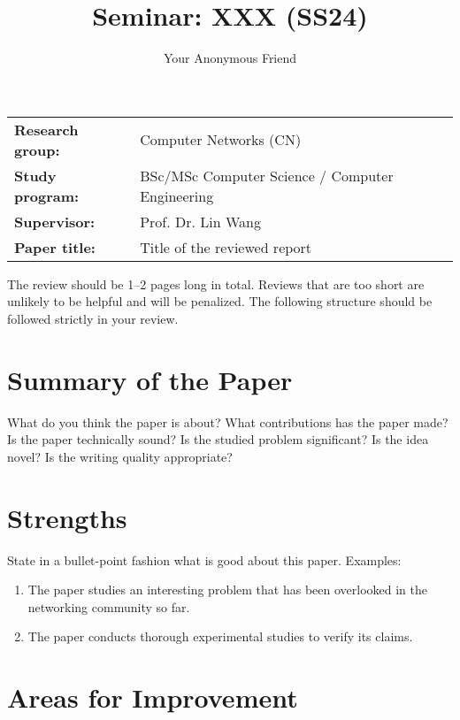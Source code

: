 \documentclass{../upb-cn}
\title{Seminar: XXX (SS24)}
\author{Your Anonymous Friend}
\begin{document}
\maketitle

\begin{notebox}
    \begin{tabular}{@{}ll}
        \textbf{Research group:} & Computer Networks (CN) \\
        \textbf{Study program:} & BSc/MSc Computer Science / Computer Engineering \\
        \textbf{Supervisor:} & Prof. Dr. Lin Wang \\
        \textbf{Paper title:} & Title of the reviewed report
    \end{tabular}
\end{notebox}

The review should be 1--2 pages long in total. Reviews that are too short are unlikely to be helpful and will be penalized. The following structure should be followed strictly in your review.

\section{Summary of the Paper}

What do you think the paper is about? What contributions has the paper made? Is the paper technically sound? Is the studied problem significant? Is the idea novel? Is the writing quality appropriate?


\section{Strengths}

State in a bullet-point fashion what is good about this paper. Examples:

\begin{enumerate}
    \item The paper studies an interesting problem that has been overlooked in the networking community so far.
    \item The paper conducts thorough experimental studies to verify its claims. 
\end{enumerate}

\section{Areas for Improvement}
\end{document}
